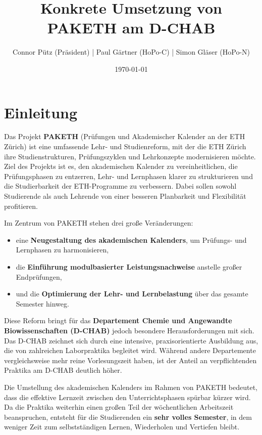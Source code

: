 \documentclass[a4paper]{article}
\title{\vspace{-1em}\textbf{Konkrete Umsetzung von PAKETH am D-CHAB}}
\author{Connor Pütz (Präsident) \quad | \quad Paul Gärtner (HoPo-C) \quad | \quad Simon Gläser (HoPo-N)}
\date{\today}
\begin{document}
\maketitle

\tableofcontents
\newpage

\section{Einleitung}

Das Projekt \textbf{PAKETH} (Prüfungen und Akademischer Kalender an der ETH Zürich) ist eine umfassende Lehr- und Studienreform, mit der die ETH Zürich ihre Studienstrukturen, Prüfungszyklen und Lehrkonzepte modernisieren möchte.  
Ziel des Projekts ist es, den akademischen Kalender zu vereinheitlichen, die Prüfungsphasen zu entzerren, Lehr- und Lernphasen klarer zu strukturieren und die Studierbarkeit der ETH-Programme zu verbessern. Dabei sollen sowohl Studierende als auch Lehrende von einer besseren Planbarkeit und Flexibilität profitieren.  

Im Zentrum von PAKETH stehen drei große Veränderungen:
\begin{itemize}[leftmargin=2em]
    \item eine \textbf{Neugestaltung des akademischen Kalenders}, um Prüfungs- und Lernphasen zu harmonisieren,
    \item die \textbf{Einführung modulbasierter Leistungsnachweise} anstelle großer Endprüfungen,
    \item und die \textbf{Optimierung der Lehr- und Lernbelastung} über das gesamte Semester hinweg.
\end{itemize}

Diese Reform bringt für das \textbf{Departement Chemie und Angewandte Biowissenschaften (D-CHAB)} jedoch besondere Herausforderungen mit sich.  
Das D-CHAB zeichnet sich durch eine intensive, praxisorientierte Ausbildung aus, die von zahlreichen Laborpraktika begleitet wird.  
Während andere Departemente vergleichsweise mehr reine Vorlesungszeit haben, ist der Anteil an verpflichtenden Praktika am D-CHAB deutlich höher.  

Die Umstellung des akademischen Kalenders im Rahmen von PAKETH bedeutet, dass die effektive Lernzeit zwischen den Unterrichtsphasen spürbar kürzer wird.  
Da die Praktika weiterhin einen großen Teil der wöchentlichen Arbeitszeit beanspruchen, entsteht für die Studierenden ein \textbf{sehr volles Semester}, in dem weniger Zeit zum selbstständigen Lernen, Wiederholen und Vertiefen bleibt.  
\end{document}
